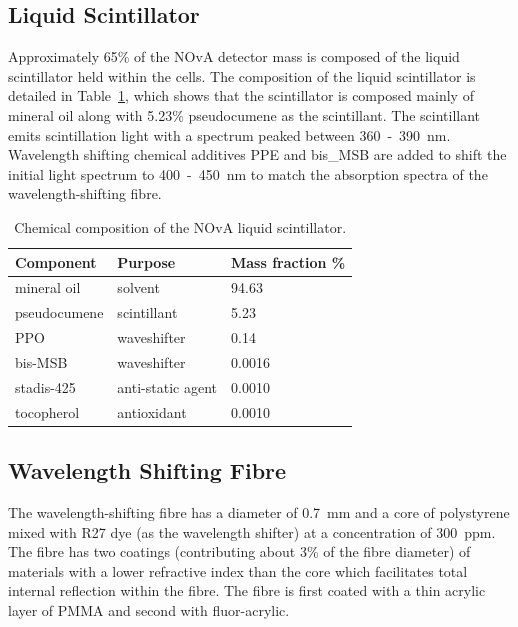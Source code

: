 \subsection{Liquid Scintillator}

Approximately 65\% of the NOvA detector mass is composed of the liquid
scintillator held within the cells. The composition of the liquid
scintillator is detailed in Table~\ref{tab:scintComp}, which shows that
the scintillator is composed mainly of mineral oil along with 5.23\%
pseudocumene as the scintillant. The scintillant emits scintillation
light with a spectrum peaked between 360~-~390~nm. Wavelength shifting
chemical additives PPE and bis\_MSB are added to shift the initial
light spectrum to 400~-~450~nm to match the absorption spectra of the
wavelength-shifting fibre. 


\begin{table}
  \centering
  \begin{tabular}{ l | l | l }
    Component & Purpose & Mass fraction \% \\ \hline
    mineral oil & solvent & 94.63 \\
    pseudocumene & scintillant & 5.23 \\
    PPO & waveshifter & 0.14 \\
    bis-MSB & waveshifter & 0.0016 \\
    stadis-425 & anti-static agent & 0.0010 \\
    tocopherol & antioxidant & 0.0010 \\
  \end{tabular}
  \caption{Chemical composition of the NOvA liquid scintillator. \cite{scintillatorComp} }
  \label{tab:scintComp}
\end{table}


\subsection{Wavelength Shifting Fibre}
The wavelength-shifting fibre has a diameter of 0.7~mm and a core of
polystyrene mixed with R27 dye (as the wavelength shifter) at a
concentration of 300~ppm. The fibre has two
coatings (contributing about 3\% of the fibre diameter) of materials
with a lower refractive index than the core
which facilitates total internal reflection within the fibre. The
fibre is first coated with a thin acrylic layer of PMMA and second
with fluor-acrylic. 

